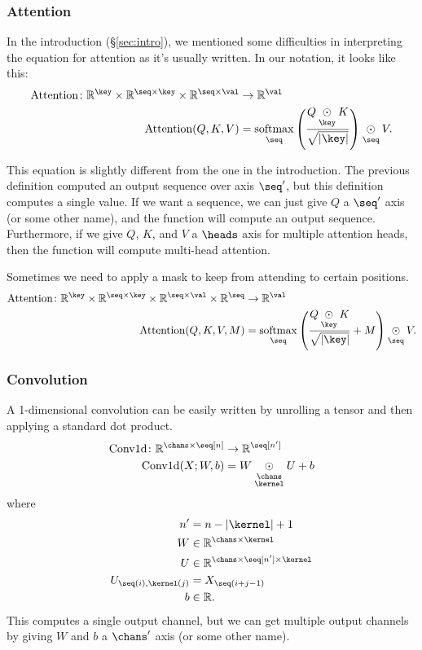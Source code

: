 \documentclass{article}
\newcommand{\reals}{\mathbb{R}}
\begin{document}
\subsubsection{Attention}
\label{sec:attention}

In the introduction (\S\ref{sec:intro}), we mentioned some difficulties in interpreting the equation for attention as it's usually written. In our notation, it looks like this:
\begin{align*}
  \text{Attention} \colon \mathbb{R}^{\key} \times \mathbb{R}^{\seq \times\key} \times \mathbb{R}^{\seq \times\val} &\rightarrow \mathbb{R}^{\val} \\
  \text{Attention}(Q,K,V) &= \nfun{\seq}{softmax} \left( \frac{Q \ndot{\key} K}{\sqrt{|\key|}} \right) \ndot{\seq} V.
\end{align*}

This equation is slightly different from the one in the introduction. The previous definition computed an output sequence over axis $\seq'$, but this definition computes a single value. If we want a sequence, we can just give $Q$ a $\seq'$ axis (or some other name), and the function will compute an output sequence. Furthermore, if we give $Q$, $K$, and $V$ a $\heads$ axis for multiple attention heads, then the function will compute multi-head attention.

Sometimes we need to apply a mask to keep from attending to certain positions.
\begin{align*}
  \text{Attention} \colon \mathbb{R}^{\key} \times \mathbb{R}^{\seq \times\key} \times \mathbb{R}^{\seq \times\val} \times \mathbb{R}^{\seq} &\rightarrow \mathbb{R}^{\val} \\
\text{Attention}(Q, K, V, M) &= \nfun{\seq}{softmax} \left( \frac{Q \ndot{\key} K}{\sqrt{|\key|}} + M \right) \ndot{\seq} V.
\end{align*}

\subsubsection{Convolution}

A 1-dimensional convolution can be easily written by unrolling a tensor and then
applying a standard dot product.
\begin{align*}
\text{Conv1d} \colon \reals^{\chans \times \seq[n]} &\rightarrow \mathbb{R}^{\seq[n']} \\
\text{Conv1d}(X; W, b) &= W \ndot{\chans \\ \kernel} U + b
\end{align*}
where
\begin{align*}
n' &= n-|\kernel|+1 \\
W &\in \reals^{\chans \times \kernel} \\
U &\in \reals^{\chans \times \seq[n'] \times \kernel} \\
U_{\seq(i), \kernel(j)} & = X_{\seq(i+j - 1)} \\
b &\in \reals.
\end{align*}
This computes a single output channel, but we can get multiple output channels by giving $W$ and $b$ a $\chans'$ axis (or some other name).
\end{document}
